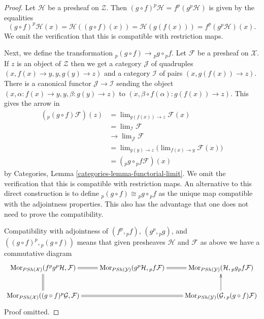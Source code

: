\documentclass{stacks-project}
\theoremstyle{plain}
\theoremstyle{definition}
\theoremstyle{remark}
\numberwithin{equation}{subsection}
\def\lim{\mathop{\mathrm{lim}}\nolimits}
\def\Mor{\mathop{\mathrm{Mor}}\nolimits}
\begin{document}
\begin{proof}
Let $\mathcal{H}$ be a presheaf on $\mathcal{Z}$. Then
$(g \circ f)^p\mathcal{H} = f^p (g^p\mathcal{H})$ is given
by the equalities
$$
(g \circ f)^p\mathcal{H}(x) = \mathcal{H}((g \circ f)(x))
= \mathcal{H}(g(f(x))) = f^p (g^p\mathcal{H})(x).
$$
We omit the verification that this is compatible with restriction maps.

\medskip\noindent
Next, we define the transformation ${}_p(g \circ f) \to {}_pg \circ {}_pf$.
Let $\mathcal{F}$ be a presheaf on $\mathcal{X}$.
If $z$ is an object of $\mathcal{Z}$ then we get a
category $\mathcal{J}$ of quadruples
$(x, f(x) \to y, y, g(y) \to z)$ and a category $\mathcal{I}$
of pairs $(x, g(f(x)) \to z)$. There is a canonical functor
$\mathcal{J} \to \mathcal{I}$ sending the object
$(x, \alpha : f(x) \to y, y, \beta : g(y) \to z)$ to
$(x, \beta \circ f(\alpha) : g(f(x)) \to z)$. This gives the arrow in
\begin{align*}
({}_p(g \circ f)\mathcal{F})(z) & =
\lim_{g(f(x)) \to z} \mathcal{F}(x) \\
& = \lim_\mathcal{I} \mathcal{F} \\
& \to \lim_\mathcal{J} \mathcal{F} \\
& = \lim_{g(y) \to z}
\Big(\lim_{f(x) \to y} \mathcal{F}(x)\Big) \\
& =
({}_pg \circ {}_pf\mathcal{F})(x)
\end{align*}
by
Categories, Lemma \ref{categories-lemma-functorial-limit}.
We omit the verification that this is compatible with restriction maps.
An alternative to this direct construction is to define
${}_p(g \circ f) \cong {}_pg \circ {}_pf$
as the unique map compatible with the adjointness properties. This also
has the advantage that one does not need to prove the compatibility.

\medskip\noindent
Compatibility with adjointness of $(f^p, {}_pf)$, $(g^p, {}_pg)$, and
$((g \circ f)^p, {}_p(g \circ f))$ means that given presheaves
$\mathcal{H}$ and $\mathcal{F}$ as above we have a commutative diagram
$$
\xymatrix{
\Mor_{\textit{PSh}(\mathcal{X})}(f^pg^p\mathcal{H}, \mathcal{F})
\ar@{=}[r] \ar@{=}[d] &
\Mor_{\textit{PSh}(\mathcal{Y})}(g^p\mathcal{H}, {}_pf\mathcal{F})
\ar@{=}[r] &
\Mor_{\textit{PSh}(\mathcal{Y})}(\mathcal{H}, {}_pg{}_pf\mathcal{F})
\\
\Mor_{\textit{PSh}(\mathcal{X})}((g \circ f)^p\mathcal{G}, \mathcal{F})
\ar@{=}[rr] & &
\Mor_{\textit{PSh}(\mathcal{Y})}(\mathcal{G}, {}_p(g \circ f)\mathcal{F})
\ar[u]
}
$$
Proof omitted.
\end{proof}
\end{document}
